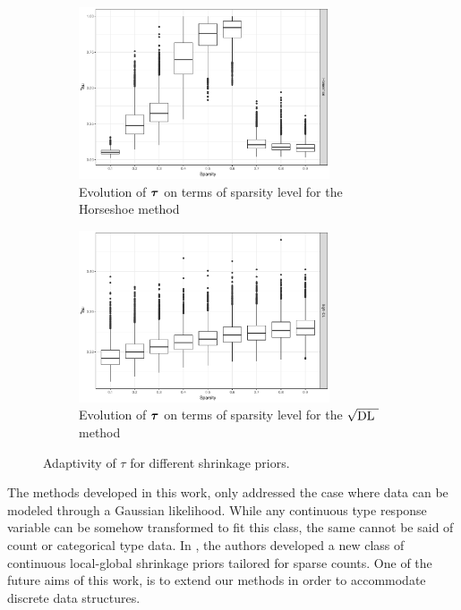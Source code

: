 \documentclass[10pt]{article}
\def\sqdl{$\sqrt{\text{\rm{DL} }}$}
\begin{document}
\begin{figure}[ht!]%
\begin{subfigure}{0.48\linewidth}
\centering
\includegraphics[height=2in]{Tau_hs}\caption{Evolution of $\boldsymbol{\tau}$ on terms of sparsity level for the Horseshoe method}
\label{fig:tau-hs}
\end{subfigure}
\begin{subfigure}{0.48\linewidth}
\centering
\includegraphics[height=2in]{Tau_dl}\caption{Evolution of $\boldsymbol{\tau}$ on terms of sparsity level for the \sqdl method}
\label{fig:tau-dl}
\end{subfigure}
\caption{Adaptivity of $\tau$ for different shrinkage priors.}%
\label{fig:tau}%
\end{figure}

The methods developed in this work, only addressed the case where data can be modeled through a Gaussian likelihood. While any continuous type response variable can be somehow transformed to fit this class, the same cannot be said of count or categorical type data. In \citep{datta2016bayesian}, the authors developed a new class of continuous local-global shrinkage priors tailored for
sparse counts. One of the future aims of this work, is to extend our methods in order to accommodate discrete data structures. 

\end{document}
